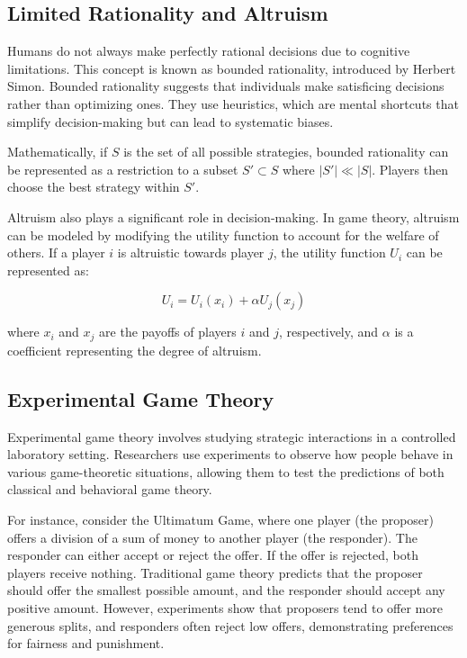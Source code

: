 \documentclass[12pt]{book} %
\begin{document}
\subsection{Limited Rationality and Altruism}
Humans do not always make perfectly rational decisions due to cognitive limitations. This concept is known as bounded rationality, introduced by Herbert Simon. Bounded rationality suggests that individuals make satisficing decisions rather than optimizing ones. They use heuristics, which are mental shortcuts that simplify decision-making but can lead to systematic biases.

Mathematically, if \( S \) is the set of all possible strategies, bounded rationality can be represented as a restriction to a subset \( S' \subset S \) where \( |S'| \ll |S| \). Players then choose the best strategy within \( S' \).

Altruism also plays a significant role in decision-making. In game theory, altruism can be modeled by modifying the utility function to account for the welfare of others. If a player \( i \) is altruistic towards player \( j \), the utility function \( U_i \) can be represented as:

\[
U_i = U_i(x_i) + \alpha U_j(x_j)
\]

where \( x_i \) and \( x_j \) are the payoffs of players \( i \) and \( j \), respectively, and \( \alpha \) is a coefficient representing the degree of altruism.

\subsection{Experimental Game Theory}
Experimental game theory involves studying strategic interactions in a controlled laboratory setting. Researchers use experiments to observe how people behave in various game-theoretic situations, allowing them to test the predictions of both classical and behavioral game theory.

For instance, consider the Ultimatum Game, where one player (the proposer) offers a division of a sum of money to another player (the responder). The responder can either accept or reject the offer. If the offer is rejected, both players receive nothing. Traditional game theory predicts that the proposer should offer the smallest possible amount, and the responder should accept any positive amount. However, experiments show that proposers tend to offer more generous splits, and responders often reject low offers, demonstrating preferences for fairness and punishment.
\end{document}
